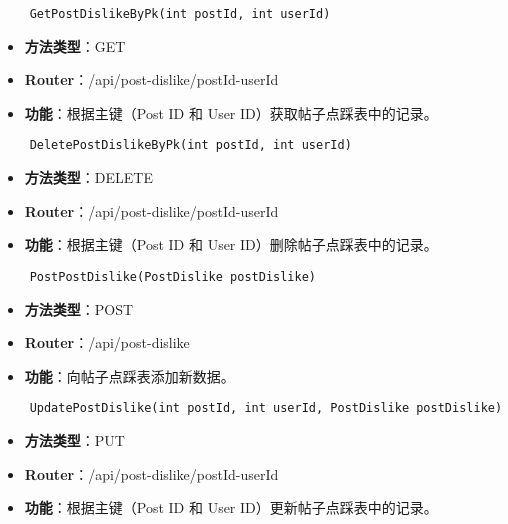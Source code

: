 \begin{verbatim}
	GetPostDislikeByPk(int postId, int userId)
\end{verbatim}

\begin{itemize}
	\item \textbf{方法类型}：GET
	\item \textbf{Router}：/api/post-dislike/{postId}-{userId}
	\item \textbf{功能}：根据主键（Post ID 和 User ID）获取帖子点踩表中的记录。
\end{itemize}

\begin{verbatim}
	DeletePostDislikeByPk(int postId, int userId)
\end{verbatim}

\begin{itemize}
	\item \textbf{方法类型}：DELETE
	\item \textbf{Router}：/api/post-dislike/{postId}-{userId}
	\item \textbf{功能}：根据主键（Post ID 和 User ID）删除帖子点踩表中的记录。
\end{itemize}

\begin{verbatim}
	PostPostDislike(PostDislike postDislike)
\end{verbatim}

\begin{itemize}
	\item \textbf{方法类型}：POST
	\item \textbf{Router}：/api/post-dislike
	\item \textbf{功能}：向帖子点踩表添加新数据。
\end{itemize}

\begin{verbatim}
	UpdatePostDislike(int postId, int userId, PostDislike postDislike)
\end{verbatim}

\begin{itemize}
	\item \textbf{方法类型}：PUT
	\item \textbf{Router}：/api/post-dislike/{postId}-{userId}
	\item \textbf{功能}：根据主键（Post ID 和 User ID）更新帖子点踩表中的记录。
\end{itemize}

